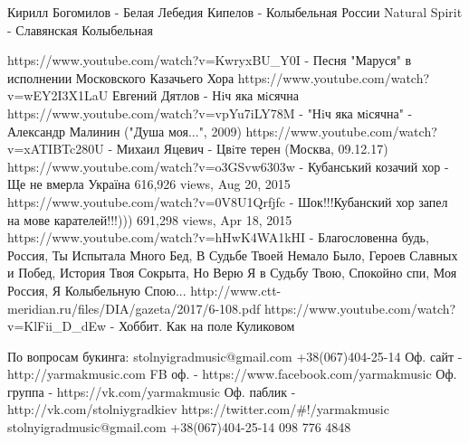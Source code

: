  
 

Кирилл Богомилов - Белая Лебедия
Кипелов - Колыбельная России
Natural Spirit - Славянская Колыбельная

https://www.youtube.com/watch?v=KwryxBU_Y0I - Песня "Маруся" в исполнении Московского Казачьего Хора
https://www.youtube.com/watch?v=wEY2I3X1LaU Евгений Дятлов - Нiч яка мiсячна
https://www.youtube.com/watch?v=vpYu7iLY78M - "Нiч яка мiсячна" - Александр Малинин ("Душа моя...", 2009)
https://www.youtube.com/watch?v=xATIBTc280U - Михаил Яцевич - Цвiте терен (Москва, 09.12.17)
https://www.youtube.com/watch?v=o3GSvw6303w - Кубанський козачий хор - Ще не вмерла Україна
616,926 views, Aug 20, 2015
https://www.youtube.com/watch?v=0V8U1Qrfjfc - Шок!!!Кубанский хор запел на мове карателей!!!)))
691,298 views, Apr 18, 2015
https://www.youtube.com/watch?v=hHwK4WA1kHI - Благословенна будь, Россия, Ты Испытала Много Бед,
В Судьбе Твоей Немало Было, Героев Славных и Побед, История Твоя Сокрыта, Но Верю Я в Судьбу Твою,
Спокойно спи, Моя Россия, Я Колыбельную Спою...
http://www.ctt-meridian.ru/files/DIA/gazeta/2017/6-108.pdf
https://www.youtube.com/watch?v=KlFii_D_dEw - Хоббит. Как на поле Куликовом


По вопросам букинга: 
stolnyigradmusic@gmail.com 
+38(067)404-25-14
Оф. сайт - http://yarmakmusic.com
FB оф. - https://www.facebook.com/yarmakmusic
Оф. группа - https://vk.com/yarmakmusic
Оф. паблик - http://vk.com/stolniygradkiev
https://twitter.com/#!/yarmakmusic
stolnyigradmusic@gmail.com 
+38(067)404-25-14
098 776 4848
